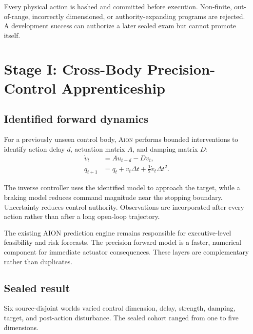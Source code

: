 \documentclass[11pt,a4paper]{article}
\newcommand{\AION}{\textsc{Aion}}
\begin{document}
Every physical action is hashed and committed before execution.  Non-finite,
out-of-range, incorrectly dimensioned, or authority-expanding programs are
rejected.  A development success can authorize a later sealed exam but cannot
promote itself.

\section{Stage I: Cross-Body Precision-Control Apprenticeship}

\subsection{Identified forward dynamics}

For a previously unseen control body, \AION{} performs bounded interventions
to identify action delay $d$, actuation matrix $A$, and damping matrix $D$:
\begin{align}
\dot{v}_{t} &= A u_{t-d} - Dv_t, \\
q_{t+1} &= q_t + v_t\Delta t
          + \tfrac{1}{2}\dot{v}_{t}\Delta t^2.
\label{eq:forward-model}
\end{align}

The inverse controller uses the identified model to approach the target, while
a braking model reduces command magnitude near the stopping boundary.
Uncertainty reduces control authority.  Observations are incorporated after
every action rather than after a long open-loop trajectory.

The existing AION prediction engine remains responsible for executive-level
feasibility and risk forecasts.  The precision forward model is a faster,
numerical component for immediate actuator consequences.  These layers are
complementary rather than duplicates.

\subsection{Sealed result}

Six source-disjoint worlds varied control dimension, delay, strength, damping,
target, and post-action disturbance.  The sealed cohort ranged from one to
five dimensions.
\end{document}
